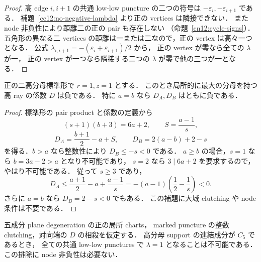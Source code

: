 \begin{proof}
高 edge $i,i+1$ の共通 low-low puncture の二つの符号は
$-\varepsilon_i,-\varepsilon_{i+1}$ である．
補題~\ref{cc12:no-negative-lambda} より正の vertices は隣接できない．
また node 非負性により距離二の正の pair も存在しない
（命題~\ref{cn12:cycle-signs}）．
五角形の異なる二 vertices の距離は一または二なので，正の vertex は高々一つとなる．
公式 $\lambda_{i,i+1}=-(\varepsilon_i+\varepsilon_{i+1})/2$ から，
正の vertex が零なら全ての $\lambda$ が一，
正の vertex が一つなら隣接する二つの $\lambda$ が零で他の三つが一となる．
\end{proof}

\begin{lemma}
\label{cc12:unit-positive-max}
正の二高分母標準形で $r=1,z=1$ とする．
このとき局所的に最大の分母を持つ高 ray の係数 $D$ は負である．
特に $a=b$ なら $D_A,D_B$ はともに負である．
\end{lemma}

\begin{proof}
標準形の pair product と係数の定義から
\[
 (s+1)(b+3)=6a+2,\qquad S=\frac{a-1}{s},
\]
\[
 D_A=\frac{b+1}{2}-a+S,\qquad
 D_B=2(a-b)+2-s
\]
を得る．$b>a$ なら整数性により $D_B\leq-s<0$ である．
$a\geq b$ の場合，$s=1$ なら $b=3a-2>a$ となり不可能であり，
$s=2$ なら $3\mid6a+2$ を要求するので，やはり不可能である．
従って $s\geq3$ であり，
\[
 D_A\leq\frac{a+1}{2}-a+\frac{a-1}{s}
 =-(a-1)\left(\frac12-\frac1s\right)<0.
\]
さらに $a=b$ なら $D_B=2-s<0$ でもある．
この補題に大域 clutching や node 条件は不要である．
\end{proof}

\begin{theorem}
\label{cc12:no-all-positive-common}
五成分 plane degeneration の正の局所 charts，
marked puncture の整数 clutching，対向端の $D$ の相殺を仮定する．
高分母 support の連結成分が $C_5$ であるとき，
全ての共通 low-low punctures で $\lambda=1$ となることは不可能である．
この排除に node 非負性は必要ない．
\end{theorem}

